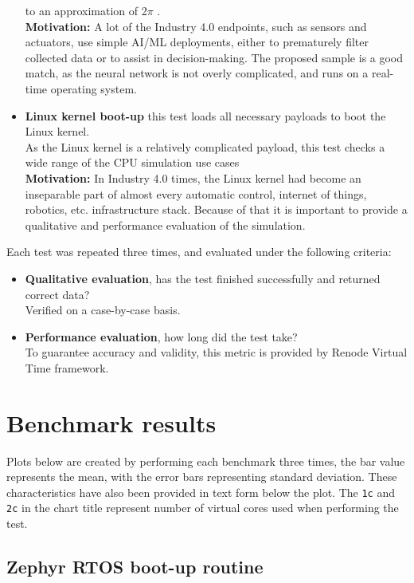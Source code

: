 \begin{itemize}
{    to an approximation of 2$\pi$ \cite{ZephyrTF}.\\
    \textbf{Motivation:} A lot of the Industry 4.0 endpoints, such as sensors and actuators, use simple AI/ML
    deployments, either to prematurely filter collected data or to assist in decision-making. The proposed sample
    is a good match, as the neural network is not overly complicated, and runs on a real-time operating system.}
    \item{\textbf{Linux kernel boot-up} this test loads all necessary payloads to boot the Linux kernel.\\
    As the Linux kernel is a relatively complicated payload, this test checks a wide range of the CPU simulation use
    cases\\
    \textbf{Motivation:} In Industry 4.0 times, the Linux kernel had become an inseparable part of almost every
    automatic control, internet of things, robotics, etc. infrastructure stack. Because of that it is important to
    provide a qualitative and performance evaluation of the simulation.}
\end{itemize}

\noindent
Each test was repeated three times, and evaluated under the following criteria:
\begin{itemize}
    \item{\textbf{Qualitative evaluation}, has the test finished successfully and returned correct data?\\
    Verified on a case-by-case basis.}
    \item{\textbf{Performance evaluation}, how long did the test take?\\To guarantee accuracy and validity, this metric is
     provided by Renode Virtual Time framework.}
\end{itemize}

\pagebreak

\section{Benchmark results}

Plots below are created by performing each benchmark three times, the bar value represents the mean, with the error bars
representing standard deviation. These characteristics have also been provided in text form below the plot. The
\texttt{1c} and \texttt{2c} in the chart title represent number of virtual cores used when performing the test.

\subsection{Zephyr RTOS boot-up routine}

